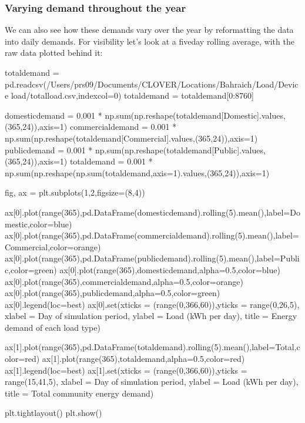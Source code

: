 \documentclass[letterpaper,10pt,english]{sphinxmanual}
\begin{document}
\subsubsection{Varying demand throughout the year}
\label{\detokenize{load:varying-demand-throughout-the-year}}
\sphinxAtStartPar
We can also see how these demands vary over the year by reformatting the
data into daily demands. For visibility let’s look at a five\sphinxhyphen{}day rolling
average, with the raw data plotted behind it:

\begin{sphinxVerbatim}[commandchars=\\\{\}]
total\PYGZus{}demand = pd.read\PYGZus{}csv(\PYGZdq{}/Users/prs09/Documents/CLOVER/Locations/Bahraich/Load/Device load/total\PYGZus{}load.csv\PYGZdq{},index\PYGZus{}col=0)
total\PYGZus{}demand = total\PYGZus{}demand[0:8760]

domestic\PYGZus{}demand = 0.001 * np.sum(np.reshape(total\PYGZus{}demand[\PYGZsq{}Domestic\PYGZsq{}].values,(365,24)),axis=1)
commercial\PYGZus{}demand = 0.001 * np.sum(np.reshape(total\PYGZus{}demand[\PYGZsq{}Commercial\PYGZsq{}].values,(365,24)),axis=1)
public\PYGZus{}demand = 0.001 * np.sum(np.reshape(total\PYGZus{}demand[\PYGZsq{}Public\PYGZsq{}].values,(365,24)),axis=1)
total\PYGZus{}demand = 0.001 * np.sum(np.reshape(np.sum(total\PYGZus{}demand,axis=1).values,(365,24)),axis=1)

fig, ax = plt.subplots(1,2,figsize=(8,4))

ax[0].plot(range(365),pd.DataFrame(domestic\PYGZus{}demand).rolling(5).mean(),label=\PYGZsq{}Domestic\PYGZsq{},color=\PYGZsq{}blue\PYGZsq{})
ax[0].plot(range(365),pd.DataFrame(commercial\PYGZus{}demand).rolling(5).mean(),label=\PYGZsq{}Commercial\PYGZsq{},color=\PYGZsq{}orange\PYGZsq{})
ax[0].plot(range(365),pd.DataFrame(public\PYGZus{}demand).rolling(5).mean(),label=\PYGZsq{}Public\PYGZsq{},color=\PYGZsq{}green\PYGZsq{})
ax[0].plot(range(365),domestic\PYGZus{}demand,alpha=0.5,color=\PYGZsq{}blue\PYGZsq{})
ax[0].plot(range(365),commercial\PYGZus{}demand,alpha=0.5,color=\PYGZsq{}orange\PYGZsq{})
ax[0].plot(range(365),public\PYGZus{}demand,alpha=0.5,color=\PYGZsq{}green\PYGZsq{})
ax[0].legend(loc=\PYGZsq{}best\PYGZsq{})
ax[0].set(xticks = (range(0,366,60)),yticks = range(0,26,5),
          xlabel = \PYGZsq{}Day of simulation period\PYGZsq{},
          ylabel = \PYGZsq{}Load (kWh per day)\PYGZsq{},
          title = \PYGZsq{}Energy demand of each load type\PYGZsq{})

ax[1].plot(range(365),pd.DataFrame(total\PYGZus{}demand).rolling(5).mean(),label=\PYGZsq{}Total\PYGZsq{},color=\PYGZsq{}red\PYGZsq{})
ax[1].plot(range(365),total\PYGZus{}demand,alpha=0.5,color=\PYGZsq{}red\PYGZsq{})
ax[1].legend(loc=\PYGZsq{}best\PYGZsq{})
ax[1].set(xticks = (range(0,366,60)),yticks = range(15,41,5),
          xlabel = \PYGZsq{}Day of simulation period\PYGZsq{},
          ylabel = \PYGZsq{}Load (kWh per day)\PYGZsq{},
          title = \PYGZsq{}Total community energy demand\PYGZsq{})

plt.tight\PYGZus{}layout()
plt.show()
\end{sphinxVerbatim}
\end{document}

